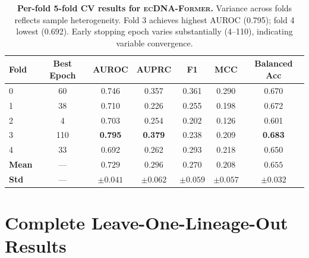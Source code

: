 \documentclass{article}
\newcommand{\former}{\textsc{ecDNA-Former}}
\begin{document}
\begin{table}[h]
\caption{\textbf{Per-fold 5-fold CV results for \former{}.} Variance across folds reflects sample heterogeneity. Fold 3 achieves highest AUROC (0.795); fold 4 lowest (0.692). Early stopping epoch varies substantially (4--110), indicating variable convergence.}
\label{tab:perfold}
\centering
\small
\begin{tabular}{@{}lcccccc@{}}
\toprule
Fold & Best Epoch & AUROC & AUPRC & F1 & MCC & Balanced Acc \\
\midrule
0 & 60 & 0.746 & 0.357 & 0.361 & 0.290 & 0.670 \\
1 & 38 & 0.710 & 0.226 & 0.255 & 0.198 & 0.672 \\
2 & 4 & 0.703 & 0.254 & 0.202 & 0.126 & 0.601 \\
3 & 110 & \textbf{0.795} & \textbf{0.379} & 0.238 & 0.209 & \textbf{0.683} \\
4 & 33 & 0.692 & 0.262 & 0.293 & 0.218 & 0.650 \\
\midrule
\textbf{Mean} & --- & $0.729$ & $0.296$ & $0.270$ & $0.208$ & $0.655$ \\
\textbf{Std} & --- & $\pm 0.041$ & $\pm 0.062$ & $\pm 0.059$ & $\pm 0.057$ & $\pm 0.032$ \\
\bottomrule
\end{tabular}
\end{table}


\section{Complete Leave-One-Lineage-Out Results}
\label{app:loocv}
\end{document}
